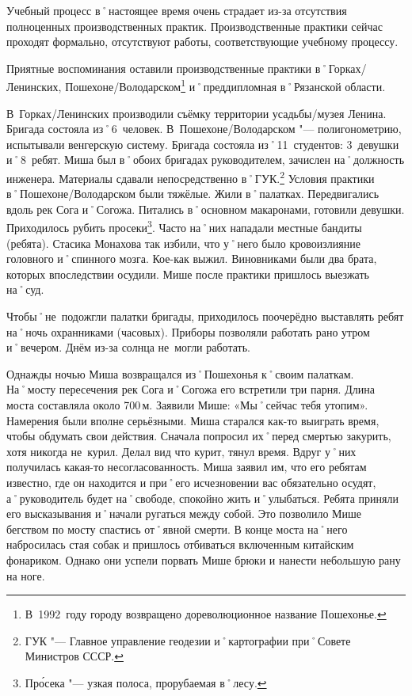 Учебный процесс в˚настоящее время очень страдает из-за отсутствия полноценных производственных практик. Производственные практики сейчас проходят формально, отсутствуют работы, соответствующие учебному процессу. 

Приятные воспоминания оставили производственные практики в˚Горках\-/Ленинских, Пошехоне\-/Володарском\footnote{В~1992~году городу возвращено дореволюционное название Пошехонье.} и˚преддипломная в˚Рязанской области.

В~Горках\-/Ленинских производили съёмку территории усадьбы\-/музея Ленина. Бригада состояла из˚6~человек. В~Пошехоне\-/Володарском "--- полигонометрию, испытывали венгерскую систему. Бригада состояла из˚11~студентов: 3~девушки и˚8~ребят. Миша был в˚обоих бригадах руководителем, зачислен на˚должность инженера. Материалы сдавали непосредственно в˚ГУК.\footnote{ГУК "--- Главное управление геодезии и˚картографии при˚Совете Министров СССР.} Условия практики в˚Пошехоне\-/Володарском были тяжёлые. Жили в˚палатках. Передвигались вдоль рек Сога и˚Согожа. Питались в˚основном макаронами, готовили девушки. Приходилось рубить просеки\footnote{Пр\'{о}сека "--- узкая полоса, прорубаемая в˚лесу.}. Часто на˚них нападали местные бандиты (ребята). Стасика Монахова так избили, что у˚него было кровоизлияние головного и˚спинного мозга. Кое-как выжил. Виновниками были два брата, которых впоследствии осудили. Мише после практики пришлось выезжать на˚суд. 

Чтобы˚не~подожгли палатки бригады, приходилось поочерёдно выставлять ребят на˚ночь охранниками (часовых). Приборы позволяли работать рано утром и˚вечером. Днём из-за солнца не~могли работать. 

Однажды ночью Миша возвращался из˚Пошехонья к˚своим палаткам. На˚мосту пересечения рек Сога и˚Согожа его встретили три парня. Длина моста составляла около 700\,м. Заявили Мише: «Мы˚сейчас тебя утопим». Намерения были вполне серьёзными. Миша старался как-то выиграть время, чтобы обдумать свои действия. Сначала попросил их˚перед смертью закурить, хотя никогда не~курил. Делал вид что курит, тянул время. Вдруг у˚них получилась какая-то несогласованность. Миша заявил им, что его ребятам известно, где он находится и при˚его исчезновении вас обязательно осудят, а˚руководитель будет на˚свободе, спокойно жить и˚улыбаться. Ребята приняли его высказывания и˚начали ругаться между собой. Это позволило Мише бегством по мосту спастись от˚явной смерти. В конце моста на˚него набросилась стая собак и пришлось отбиваться включенным китайским фонариком. Однако они успели порвать Мише брюки и нанести небольшую рану на ноге.


